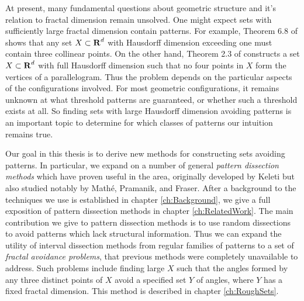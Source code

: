 At present, many fundamental questions about geometric structure and it's relation to fractal dimension remain unsolved. One might expect sets with sufficiently large fractal dimension contain patterns. For example, Theorem 6.8 of \cite{Matilla} shows that any set $X \subset \operatorname{\mathbf{R}}^d$ with Hausdorff dimension exceeding one must contain three collinear points. On the other hand, Theorem 2.3 of \cite{Maga} constructs a set $X \subset \operatorname{\mathbf{R}}^d$ with full Hausdorff dimension such that no four points in $X$ form the vertices of a parallelogram. Thus the problem depends on the particular aspects of the configurations involved. For most geometric configurations, it remains unknown at what threshold patterns are guaranteed, or whether such a threshold exists at all. So finding sets with large Hausdorff dimension avoiding patterns is an important topic to determine for which classes of patterns our intuition remains true.

Our goal in this thesis is to derive new methods for constructing sets avoiding patterns. In particular, we expand on a number of general {\it pattern dissection methods} which have proven useful in the area, originally developed by Keleti but also studied notably by Math\'{e}, Pramanik, and Fraser. After a background to the techniques we use is established in chapter \ref{ch:Background}, we give a full exposition of pattern dissection methods in chapter \ref{ch:RelatedWork}. The main contribution we give to pattern dissection methods is to use random dissections to avoid patterns which lack structural information. Thus we can expand the utility of interval dissection methods from regular families of patterns to a set of {\it fractal avoidance problems}, that previous methods were completely unavailable to address. Such problems include finding large $X$ such that the angles formed by any three distinct points of $X$ avoid a specified set $Y$ of angles, where $Y$ has a fixed fractal dimension. This method is described in chapter \ref{ch:RoughSets}.

\endinput

Any text after an \endinput is ignored.
You could put scraps here or things in progress.